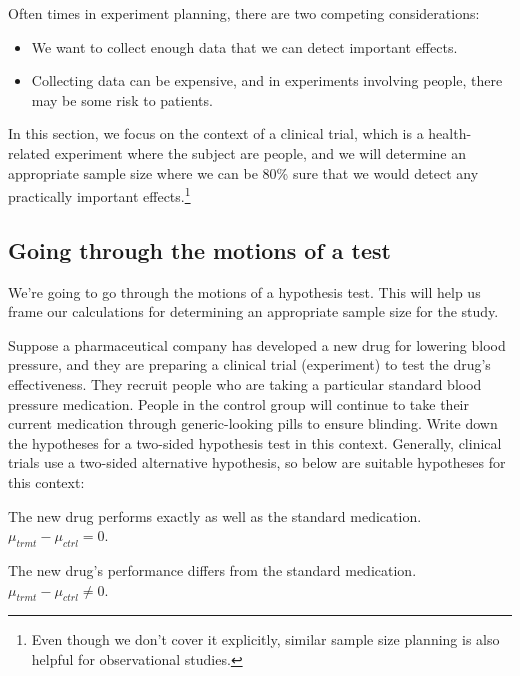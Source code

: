 \noindent%
Often times in experiment planning, there are two competing considerations:
\begin{itemize}
\setlength{\itemsep}{0mm}
\item We want to collect enough data that we can detect important effects.
\item Collecting data can be expensive, and in experiments involving people, there may be some risk to patients.
\end{itemize}
In this section, we focus on the context of a clinical trial, which is a health-related experiment where the subject are people, and we will determine an appropriate sample size where we can be 80\% sure that we would detect any practically important effects.\footnote{Even though we don't cover it explicitly, similar sample size planning is also helpful for observational studies.}


\subsection{Going through the motions of a test}

We're going to go through the motions of a hypothesis test. This will help us frame our calculations for determining an appropriate sample size for the study.

\begin{examplewrap}
\begin{nexample}{Suppose a pharmaceutical company has developed
    a new drug for lowering blood pressure, and they are
    preparing a clinical trial (experiment) to test the
    drug's effectiveness.
    They recruit people who are taking a particular standard
    blood pressure medication.
    People in the control group will continue to take their
    current medication through generic-looking pills to ensure
    blinding.
    Write down the hypotheses for a two-sided hypothesis test
    in this context.}
  Generally, clinical trials use a two-sided alternative
  hypothesis, so below are suitable hypotheses for this context:
  \begin{description}
  \setlength{\itemsep}{0mm}
  \item[$H_0$:]
      The new drug performs exactly as well as the
      standard medication. \\
      $\mu_{trmt} - \mu_{ctrl} = 0$.
  \item[$H_A$:]
      The new drug's performance differs from the
      standard medication. \\
      $\mu_{trmt} - \mu_{ctrl} \neq 0$.
  \end{description}
\end{nexample}
\end{examplewrap}

